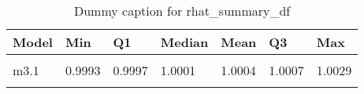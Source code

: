 \begin{table}
\centering
\caption{Dummy caption for rhat_summary_df}
\centering
\fontsize{10}{12}\selectfont
\begin{tabular}[t]{lllllll}
\toprule
Model & Min & Q1 & Median & Mean & Q3 & Max\\
\midrule
\cellcolor{gray!10}{m2} & \cellcolor{gray!10}{0.9994} & \cellcolor{gray!10}{0.9998} & \cellcolor{gray!10}{1.0001} & \cellcolor{gray!10}{1.0003} & \cellcolor{gray!10}{1.0006} & \cellcolor{gray!10}{1.0015}\\
m3.1 & 0.9993 & 0.9997 & 1.0001 & 1.0004 & 1.0007 & 1.0029\\
\cellcolor{gray!10}{m4} & \cellcolor{gray!10}{0.9992} & \cellcolor{gray!10}{0.9995} & \cellcolor{gray!10}{1.0002} & \cellcolor{gray!10}{1.0004} & \cellcolor{gray!10}{1.0012} & \cellcolor{gray!10}{1.0028}\\
\bottomrule
\end{tabular}
\end{table}

